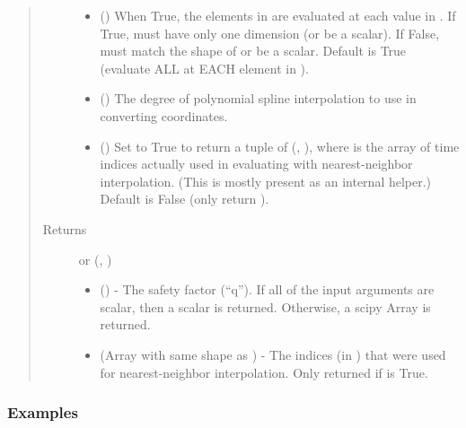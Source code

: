 \documentclass[letterpaper,10pt,english]{sphinxmanual}
\begin{document}
\begin{fulllineitems}
\begin{fulllineitems}
\begin{quote}
\begin{description}
\begin{itemize}
\item {} 
 () \textendash{} When True, the elements in  are evaluated
at each value in . If True,  must have only one dimension
(or be a scalar). If False,  must match the shape of 
or be a scalar. Default is True (evaluate ALL  at EACH
element in ).

\item {} 
 () \textendash{} The degree of polynomial spline interpolation to
use in converting coordinates.

\item {} 
 () \textendash{} Set to True to return a tuple of (,
), where  is the array of time indices
actually used in evaluating  with nearest-neighbor
interpolation. (This is mostly present as an internal helper.)
Default is False (only return ).

\end{itemize}

\item[{Returns}] \leavevmode

 or (, )
\begin{itemize}
\item {} 
 () - The safety factor (“q”). If
all of the input arguments are scalar, then a scalar is returned.
Otherwise, a scipy Array is returned.

\item {} 
 (Array with same shape as ) - The indices
(in ) that were used for
nearest-neighbor interpolation. Only returned if  is
True.

\end{itemize}


\end{description}\end{quote}
\subsubsection*{Examples}


\end{fulllineitems}
\end{fulllineitems}
\end{document}

